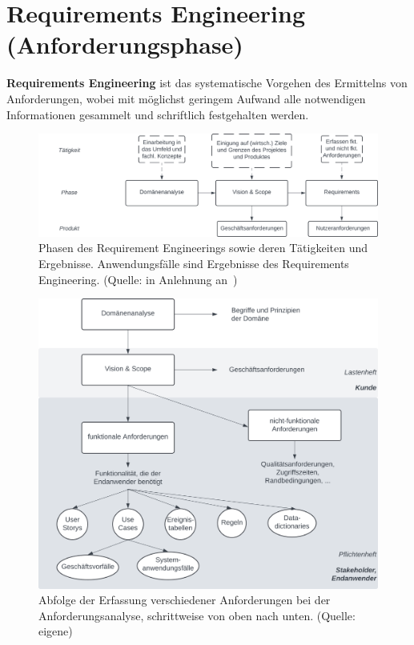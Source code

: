 \section{Requirements Engineering (Anforderungsphase)}

\begin{tcolorbox}[title=Requirements Engineering]
    \textbf{Requirements Engineering} ist das systematische Vorgehen des Ermittelns von Anforderungen,
    wobei mit möglichst geringem Aufwand alle notwendigen Informationen gesammelt und schriftlich festgehalten werden.
\end{tcolorbox}

\begin{figure}
    \centering
    \includegraphics[scale=0.35]{chapters/Anhang/CheatSheets/img/requirementsengineering}
    \caption{Phasen des Requirement Engineerings sowie deren Tätigkeiten und Ergebnisse. Anwendungsfälle sind Ergebnisse des Requirements Engineering. (Quelle: in Anlehnung an~\cite[84]{Wed09})}
    \label{fig:requirementsengineering_cc}
\end{figure}

\begin{figure}
    \centering
    \includegraphics[scale=0.35]{chapters/Anhang/CheatSheets/img/anforderung}
    \caption{Abfolge der Erfassung verschiedener Anforderungen bei der Anforderungsanalyse, schrittweise von oben nach unten. (Quelle: eigene)}
    \label{fig:anforderung_cc}
\end{figure}